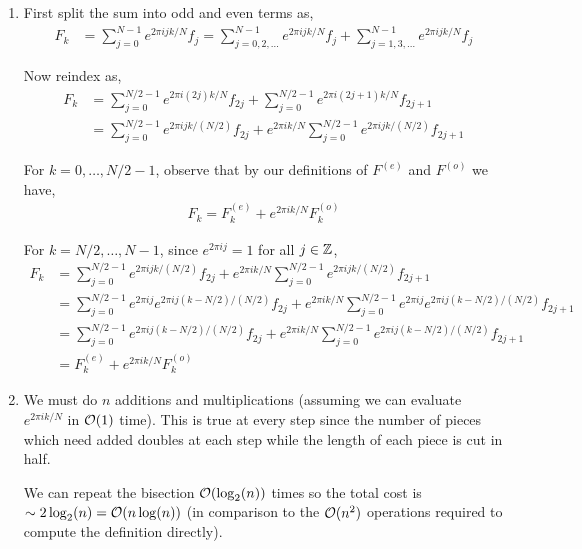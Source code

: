 \documentclass[10pt]{article}
\begin{document}
\begin{solution}[Solution]
    \begin{enumerate}[label=(\alph*)]
    \item
        First split the sum into odd and even terms as,
            \begin{align*}
                F_k &= \sum_{j=0}^{N-1}e^{2\pi i j k/N} f_j 
                = \sum_{j=0,2,\ldots}^{N-1} e^{2\pi i j k/N} f_j + \sum_{j=1,3,\ldots}^{N-1} e^{2\pi i j k/N} f_j
            \end{align*}
            
        Now reindex as,
            \begin{align*}
                F_k &= \sum_{j=0}^{N/2-1} e^{2\pi i (2j) k / N} f_{2j} + \sum_{j=0}^{N/2-1} e^{2\pi i (2j+1)k/N} f_{2j+1}
                \\&= \sum_{j=0}^{N/2-1} e^{2\pi i j k / (N/2)} f_{2j} + e^{2\pi i k/N}\sum_{j=0}^{N/2-1} e^{2\pi i jk/(N/2)} f_{2j+1}
            \end{align*}

        For \( k=0,\ldots, N/2-1 \), observe that by our definitions of \( F^{(e)} \) and \( F^{(o)} \) we have,
        \begin{align*}
            F_k = F_k^{(e)} + e^{2\pi i k/N} F_k^{(o)}
        \end{align*}
        
        For \( k = N/2, \ldots,  N-1 \),
        since \( e^{2\pi i j} = 1 \) for all \( j\in\mathbb{Z} \),   
        \begin{align*}
            F_k &= \sum_{j=0}^{N/2-1} e^{2\pi i j k / (N/2)} f_{2j} + e^{2\pi i k/N}\sum_{j=0}^{N/2-1} e^{2\pi i jk/(N/2)} f_{2j+1}
            \\&= \sum_{j=0}^{N/2-1}e^{2\pi i j} e^{2\pi i j(k-N/2) / (N/2)} f_{2j} 
            + e^{2\pi i k/N}\sum_{j=0}^{N/2-1}e^{2\pi i j} e^{2\pi i j(k-N/2)/(N/2)} f_{2j+1}
            \\&= \sum_{j=0}^{N/2-1}e^{2\pi i j(k-N/2) / (N/2)} f_{2j} 
            + e^{2\pi i k/N}\sum_{j=0}^{N/2-1}e^{2\pi i j(k-N/2)/(N/2)} f_{2j+1}
            \\&= F_k^{(e)} + e^{2\pi i k/N} F_k^{(o)}
        \end{align*}
        
    \item 
        We must do \( n \) additions and multiplications (assuming we can evaluate \( e^{2\pi ik/N} \) in \( \mathcal{O}(1) \) time). This is true at every step since the number of pieces which need added doubles at each step while the length of each piece is cut in half. 

        We can repeat the bisection \( \mathcal{O}(\log_2(n)) \) times so the total cost is \( \sim 2\log_2(n) = \mathcal{O}(n\log(n)) \) (in comparison to the \( \mathcal{O}(n^2) \) operations required to compute the definition directly).


\end{enumerate}    
\end{solution}
\end{document}
